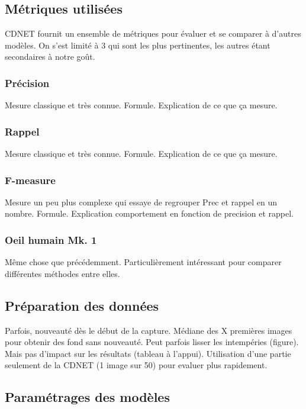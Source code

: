 	\subsection{Métriques utilisées}

	CDNET fournit un ensemble de métriques pour évaluer et se comparer à d'autres modèles. On s'est limité à 3 qui sont les plus pertinentes, les autres étant secondaires à notre goût.

	\subsubsection{Précision}

	Mesure classique et très connue. Formule. Explication de ce que ça mesure.

	\subsubsection{Rappel}

	Mesure classique et très connue. Formule. Explication de ce que ça mesure.

	\subsubsection{F-measure}

	Mesure un peu plus complexe qui essaye de regrouper Prec et rappel en un nombre. Formule. Explication comportement en fonction de precision et rappel.

	\subsubsection{Oeil humain Mk. 1}

	Même chose que précédemment. Particulièrement intéressant pour comparer différentes méthodes entre elles.

	\subsection{Préparation des données}

	Parfois, nouveauté dès le début de la capture. Médiane des X premières images pour obtenir des fond sans nouveauté. Peut parfois lisser les intempéries (figure). Mais pas d'impact sur les résultats (tableau à l'appui). Utilisation d'une partie seulement de la CDNET (1 image sur 50) pour evaluer plus rapidement.

	\subsection{Paramétrages des modèles}

